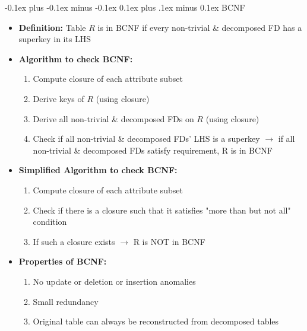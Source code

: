\documentclass[landscape]{article}
\makeatletter
\renewcommand{\subsection}{\@startsection{subsection}{2}{0mm}%
  {-0.1ex plus -0.1ex minus -0.1ex}%
  {0.1ex plus .1ex minus 0.1ex}%
{\normalfont\scriptsize\bfseries}}
\makeatother
\begin{document}
\begin{multicols*}{5}
    \subsection{BCNF}
    \begin{itemize}
      \item \textbf{Definition:} Table $R$ is in BCNF if every non-trivial \& decomposed FD has a superkey in its LHS
      \item \textbf{Algorithm to check BCNF:}
      \begin{enumerate}
        \item Compute closure of each attribute subset
        \item Derive keys of $R$ (using closure)
        \item Derive all non-trivial \& decomposed FDs on $R$ (using closure)
        \item Check if all non-trivial \& decomposed FDs' LHS is a superkey $\rightarrow$ if all non-trivial \& decomposed FDs satisfy requirement, R is in BCNF
      \end{enumerate}
      \item \textbf{Simplified Algorithm to check BCNF:}
      \begin{enumerate}
        \item Compute closure of each attribute subset
        \item Check if there is a closure such that it satisfies "more than but not all" condition
        \item If such a closure exists $\rightarrow$ R is NOT in BCNF
      \end{enumerate}
      \item \textbf{Properties of BCNF:}
      \begin{enumerate}
        \item No update or deletion or insertion anomalies
        \item Small redundancy
        \item Original table can always be reconstructed from decomposed tables
      \end{enumerate}
    \end{itemize}


\end{multicols*}
\end{document}
